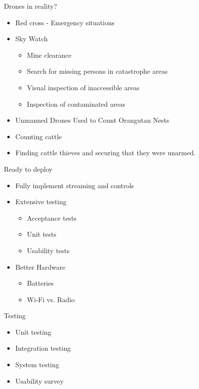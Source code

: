 
\begin{frame}{Drones in reality?}
\begin{itemize}
	\item Red cross - Emergency situations
	\item Sky Watch
	\begin{itemize}
		\item Mine clearance
		\item Search for missing persons in catastrophe areas
		\item Visual inspection of inaccessible areas
		\item Inspection of contaminated areas
	\end{itemize}
	\item Unmanned Drones Used to Count Orangutan Nests
	\item Counting cattle
	\item Finding cattle thieves and securing that they were unarmed.
\end{itemize}
\end{frame}

\begin{frame}{Ready to deploy}
\begin{itemize}
	\item Fully implement streaming and controls
	\item Extensive testing
	\begin{itemize}
		\item Acceptance tests
		\item Unit tests
		\item Usability tests
	\end{itemize}
	\item Better Hardware
	\begin{itemize}
		\item Batteries
		\item Wi-Fi vs. Radio
	\end{itemize}
\end{itemize}
\end{frame}

\begin{frame}{Testing}
\begin{itemize}
	\item Unit testing
	\item Integration testing
	\item System testing
	\item Usability survey
\end{itemize}
\end{frame}

